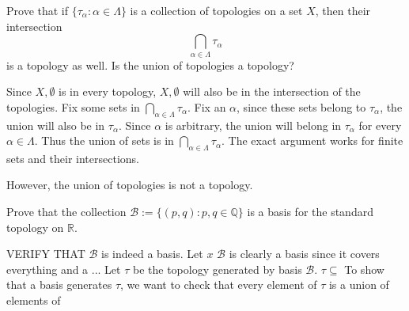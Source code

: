 \documentclass[../main.tex]{subfiles}
\begin{document}
\begin{problem}[3]
    Prove that if $\{ \tau_\alpha: \alpha \in \Lambda \}$ is a collection of topologies on a set $X$,
    then their intersection
    \[ \bigcap_{\alpha \in \Lambda} \tau_\alpha \]
    is a topology as well.
    Is the union of topologies a topology?
\end{problem}
Since $X, \emptyset$ is in every topology, $X, \emptyset$ will also be in the intersection of the topologies.
Fix some sets in $\bigcap_{\alpha \in \Lambda} \tau_\alpha$.
Fix an $\alpha$, since these sets belong to $\tau_\alpha$, the union will also be in $\tau_\alpha$.
Since $\alpha$ is arbitrary, the union will belong in $\tau_\alpha$ for every $\alpha \in \Lambda$.
Thus the union of sets is in $\bigcap_{\alpha \in \Lambda} \tau_\alpha$.
The exact argument works for finite sets and their intersections.

However, the union of topologies is not a topology.

\begin{problem}[4]
    Prove that the collection $\mathscr{B} := \{ (p, q) : p, q \in \mathbb{Q} \}$ is a basis for the standard topology on $\mathbb{R}$.
\end{problem}
VERIFY THAT $\mathscr{B}$ is indeed a basis.
Let $x$
$\mathscr{B}$ is clearly a basis since it covers everything and a ...
Let $\tau$ be the topology generated by basis $\mathscr{B}$.
$\tau \subseteq $
To show that a basis generates $\tau$, we want to check that every element of $\tau$ is a union of elements of
\end{document}
